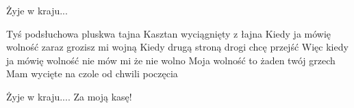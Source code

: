 \documentclass[../../../songbook.tex]{subfiles}
\begin{document}
\-\hspace{1cm} Żyje w kraju...						 \newline

Tyś podsłuchowa pluskwa tajna						 \newline
Kasztan wyciągnięty z łajna						 \newline
Kiedy ja mówię wolność zaraz grozisz mi wojną						 \newline
Kiedy drugą stroną drogi chcę przejść						 \newline
Więc kiedy ja mówię wolność nie mów mi że nie wolno						 \newline
Moja wolność to żaden twój grzech						 \newline
Mam wycięte na czole od chwili poczęcia						 \newline

\-\hspace{1cm} Żyje w kraju....						 \newline
\-\hspace{1cm} Za moją kasę!						 \newline
\end{document}
